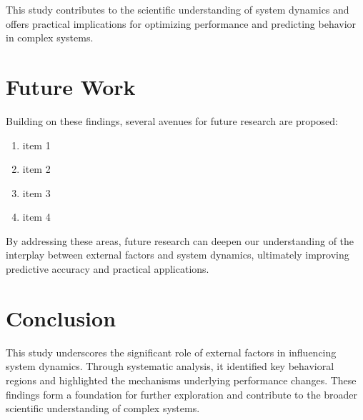 This study contributes to the scientific understanding of system dynamics and offers practical implications for optimizing performance and predicting behavior in complex systems.

\section{Future Work}
Building on these findings, several avenues for future research are proposed:

\begin{enumerate}
    \item item 1
    \item item 2
    \item item 3
    \item item 4
\end{enumerate}
By addressing these areas, future research can deepen our understanding of the interplay between external factors and system dynamics, ultimately improving predictive accuracy and practical applications.

\section{Conclusion}
This study underscores the significant role of external factors in influencing system dynamics. Through systematic analysis, it identified key behavioral regions and highlighted the mechanisms underlying performance changes. These findings form a foundation for further exploration and contribute to the broader scientific understanding of complex systems.
